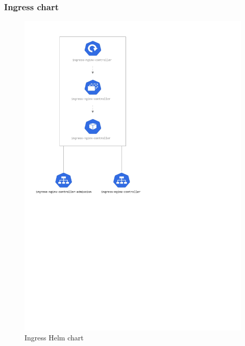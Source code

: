 \documentclass[thesis=B,english]{FITthesis}[2019/12/23]
\begin{document}
\subsubsection{Ingress chart}
\begin{figure}[H]
\centering
\caption{Ingress Helm chart}
\hspace*{1cm}
\includegraphics[scale=0.5]{ingress-diagram}
\end{figure}
\end{document}

